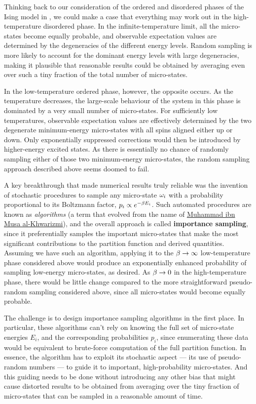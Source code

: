 Thinking back to our consideration of the ordered and disordered phases of the Ising model in , we could make a case that everything may work out in the high-temperature disordered phase.
In the infinite-temperature limit, all the micro-states become equally probable, and observable expectation values are determined by the degeneracies of the different energy levels.
Random sampling is more likely to account for the dominant energy levels with large degeneracies, making it plausible that reasonable results could be obtained by averaging even over such a tiny fraction of the total number of micro-states.

In the low-temperature ordered phase, however, the opposite occurs.
As the temperature decreases, the large-scale behaviour of the system in this phase is dominated by a very small number of micro-states.
For sufficiently low temperatures, observable expectation values are effectively determined by the two degenerate minimum-energy micro-states with all spins aligned either up or down.
Only exponentially suppressed corrections would then be introduced by higher-energy excited states.
As there is essentially no chance of randomly sampling either of those two minimum-energy micro-states, the random sampling approach described above seems doomed to fail.

A key breakthrough that made numerical results truly reliable was the invention of stochastic procedures to sample any micro-state $\omega_i$ with a probability proportional to its Boltzmann factor, $p_i \propto e^{-\beta E_i}$.
Such automated procedures are known as \textit{algorithms} (a term that evolved from the name of \href{https://en.wikipedia.org/wiki/Muhammad_ibn_Musa_al-Khwarizmi}{Muhammad ibn Musa al-Khwarizmi}), and the overall approach is called \textbf{importance sampling}, since it preferentially samples the important micro-states that make the most significant contributions to the partition function and derived quantities. %
Assuming we have such an algorithm, applying it to the $\beta \to \infty$ low-temperature phase considered above would produce an exponentially enhanced probability of sampling low-energy micro-states, as desired.
As $\beta \to 0$ in the high-temperature phase, there would be little change compared to the more straightforward pseudo-random sampling considered above, since all micro-states would become equally probable.

The challenge is to design importance sampling algorithms in the first place.
In particular, these algorithms can't rely on knowing the full set of micro-state energies $E_i$, and the corresponding probabilities $p_i$, since enumerating these data would be equivalent to brute-force computation of the full partition function.
In essence, the algorithm has to exploit its stochastic aspect --- its use of pseudo-random numbers --- to guide it to important, high-probability micro-states.
And this guiding needs to be done without introducing any other bias that might cause distorted results to be obtained from averaging over the tiny fraction of micro-states that can be sampled in a reasonable amount of time.

